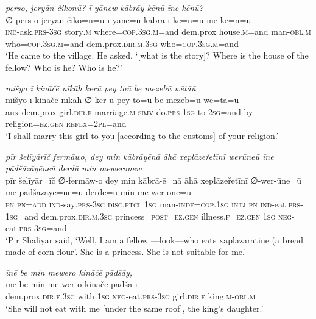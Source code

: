 \ea \label{ŽP.204}
\textit{perso, jeryān čikonū? ī yānew kābrāy kēnū īne kēnū?} \\ 
\gll ∅-pers-o jeryān čiko=n=ū ī yāne=ū kābrā-ī kē=n=ū īne kē=n=ū \\ 
 \textsc{ind-}ask\textsc{.prs}\textsc{-3sg} story\textsc{.m} where\textsc{=cop}\textsc{.3sg}\textsc{.m}=and dem.prox house\textsc{.m}=and man\textsc{-obl}\textsc{.m} who\textsc{=cop}\textsc{.3sg}\textsc{.m}=and dem.prox\textsc{.dir}\textsc{.m}\textsc{.3sg} who\textsc{=cop}\textsc{.3sg}\textsc{.m}=and \\ 
\glt `He came to the village. He asked, ‘[what is the story]? Where is the house of the fellow? Who is he? Who is he?'
\z 
 
\ea \label{ŽP.207}
\textit{mišyo ī kināčē nīkāh kerū pey toū be mezebū wētāū} \\ 
\gll mišyo ī kināčē nīkāh ∅-ker-ū pey to=ū be mezeb=ū wē=tā=ū \\ 
 aux dem.prox girl\textsc{.dir}\textsc{.f} marriage\textsc{.m} \textsc{sbjv-}do\textsc{.prs}\textsc{-\textsc{1sg}} to \textsc{2sg}=and by religion\textsc{\textsc{=ez.gen}} \textsc{reflx}=\textsc{2pl}=and \\ 
\glt `I shall marry this girl to you [according to the customs] of your religion.'
\z 
 
\ea \label{ŽP.210}
\textit{pīr šelīyārīč fermāwo, dey min kābrāyēnā āhā xeplāzeřetīnī werūneū īne pādšāzāyēneū derdū min meweronew} \\ 
\gll pīr šelīyār=īč ∅-fermāw-o dey min kābrā-ē=nā āhā xeplāzeřetīnī ∅-wer-ūne=ū īne pādšāzāyē=ne=ū derde=ū min me-wer-one=ū \\ 
 \textsc{pn} \textsc{pn}\textsc{=add} \textsc{ind-}say\textsc{.prs}\textsc{-3sg} \textsc{disc.ptcl} \textsc{1sg} man\textsc{-indf}\textsc{=cop}\textsc{.\textsc{1sg}} \textsc{intj} \textsc{pn} \textsc{ind-}eat\textsc{.prs}\textsc{-\textsc{1sg}}=and dem.prox\textsc{.dir}\textsc{.m}\textsc{.3sg} princess\textsc{=\textsc{post}}\textsc{\textsc{=ez.gen}} illness\textsc{.f}\textsc{\textsc{=ez.gen}} \textsc{1sg} \textsc{neg-}eat\textsc{.prs}\textsc{-3sg}=and \\ 
\glt `Pir Shaliyar said, ‘Well, I am a fellow —look—who eats xaplazaratine (a bread made of corn flour’. She is a princess. She is not suitable for me.'
\z 
 
\ea \label{ŽP.213}
\textit{īnē be min mewero kināčē pādšāy,} \\ 
\gll īnē be min me-wer-o kināčē pādšā-ī \\ 
 dem.prox\textsc{.dir}\textsc{.f}\textsc{.3sg} with \textsc{1sg} \textsc{neg-}eat\textsc{.prs}\textsc{-3sg} girl\textsc{.dir}\textsc{.f} king\textsc{.m}\textsc{-obl}\textsc{.m} \\ 
\glt `She will not eat with me [under the same roof], the king’s daughter.'
\z 
 
